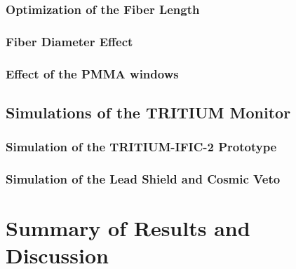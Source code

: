 \documentclass[12pt,a4paper]{book}
\begin{document}
		\subsection[Optimization of the Fiber Length]{Optimization of the Fiber Length}\label{subsec:FiberLengthSimulation}
		
				
		\subsection[Fiber Diameter]{Fiber Diameter Effect}\label{subsec:FiberDiameterSimulation}
		
		
		\subsection[Effect of the PMMA windows]{Effect of the PMMA windows}\label{subsec:PMMAWindowsSimulation}
			
						
	\section{Simulations of the TRITIUM Monitor}\label{sec:TRITIUMMonitorSimulation}
	
		
		\subsection{Simulation of the TRITIUM-IFIC-2 Prototype}\label{subsec:TritiumIFIC2Simulation}
		
		
		\subsection[Lead Shield and Cosmic Veto]{Simulation of the Lead Shield and Cosmic Veto}\label{subsec:LeadCosmicSimulation}
		
		\newpage

\chapter{Summary of Results and Discussion}  \label{chap:Summary}

\newpage
\end{document}
